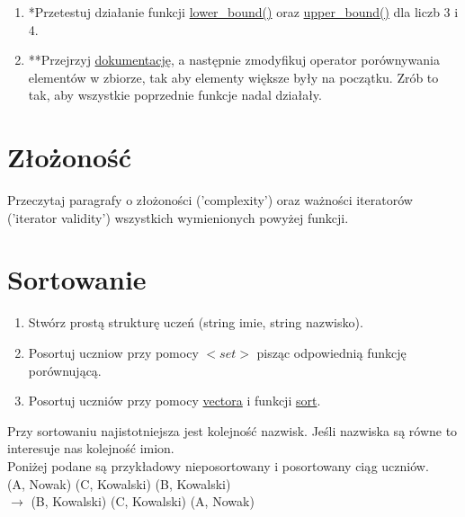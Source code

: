 \documentclass[paper=a4, fontsize=11pt]{article}
\begin{document}
\begin{enumerate}
\begin{enumerate}
\end{enumerate}


\item *Przetestuj działanie funkcji \href{http://www.cplusplus.com/reference/set/set/lower_bound/}{lower\_bound()} oraz  \href{http://www.cplusplus.com/reference/set/set/upper_bound/}{upper\_bound()} dla liczb 3 i 4.

\item **Przejrzyj \href{http://www.cplusplus.com/reference/set/set/set/}{dokumentację}, a następnie zmodyfikuj operator porównywania elementów w zbiorze, tak aby elementy większe były na początku. Zrób to tak, aby wszystkie poprzednie funkcje nadal działały.

\end{enumerate}

\section{Złożoność}
Przeczytaj paragrafy o złożoności ('complexity') oraz ważności iteratorów ('iterator validity') wszystkich wymienionych powyżej funkcji.

\section{Sortowanie}
\begin{enumerate}
\item Stwórz prostą strukturę uczeń (string imie, string nazwisko).
\item Posortuj uczniow przy pomocy $<set>$ pisząc odpowiednią funkcję porównującą. 
\item Posortuj uczniów przy pomocy \href{https://www.google.com/search?q=vector+stl}{vectora} i  funkcji \href{http://www.cplusplus.com/reference/algorithm/sort/}{sort}.
\end{enumerate}
Przy sortowaniu najistotniejsza jest kolejność nazwisk. Jeśli nazwiska są równe to interesuje nas kolejność imion. \\
Poniżej podane są przykładowy nieposortowany i posortowany ciąg uczniów. \\
(A, Nowak) (C, Kowalski) (B, Kowalski) \\
$\rightarrow$  (B, Kowalski) (C, Kowalski) (A, Nowak)
\end{document}
